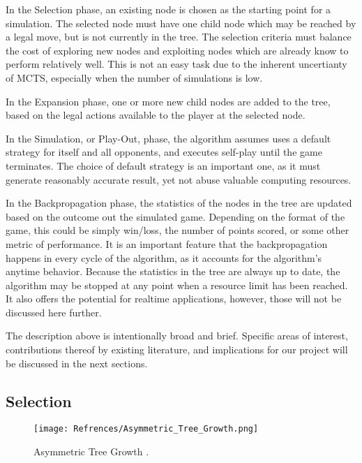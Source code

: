 \documentclass[11pt, letterpaper, twoside]{article}
\begin{document}
In the Selection phase, an existing node is chosen as the starting point for a simulation. The selected node must have one child node which may be reached by a legal move, but is not currently in the tree. The selection criteria must balance the cost of exploring new nodes and exploiting nodes which are already know to perform relatively well. This is not an easy task due to the inherent uncertianty of MCTS, especially when the number of simulations is low.

In the Expansion phase, one or more new child nodes are added to the tree, based on the legal actions available to the player at the selected node.

In the Simulation, or Play-Out, phase, the algorithm assumes uses a default strategy for itself and all opponents, and executes self-play until the game terminates. The choice of default strategy is an important one, as it must generate reasonably accurate result, yet not abuse valuable computing resources.

In the Backpropagation phase, the statistics of the nodes in the tree are updated based on the outcome out the simulated game. Depending on the format of the game, this could be simply win/loss, the number of points scored, or some other metric of performance. It is an important feature that the backpropagation happens in every cycle of the algorithm, as it accounts for the algorithm's anytime behavior. Because the statistics in the tree are always up to date, the algorithm may be stopped at any point when a resource limit has been reached. It also offers the potential for realtime applications, however, those will not be discussed here further. 

The description above is intentionally broad and brief. Specific areas of interest,  contributions thereof by existing literature, and implications for our project will be discussed in the next sections.

\subsection{Selection}

\begin{figure}
\begin{center}
  \texttt{[image: Refrences/Asymmetric\_Tree\_Growth.png]}
  \caption{Asymmetric Tree Growth \cite{mcts_survey}.}
  \label{fig:asymmetric}
 \end{center}
\end{figure}
\end{document}
